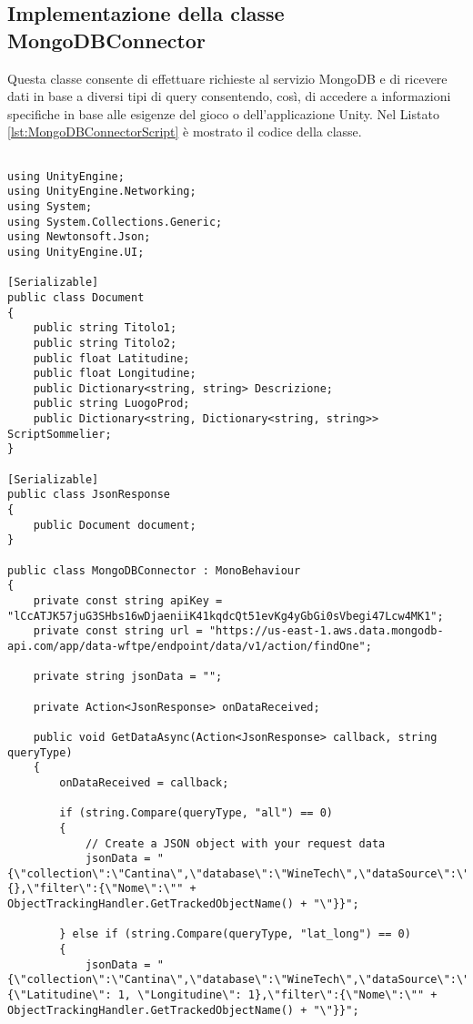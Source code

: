 \subsection{Implementazione della classe MongoDBConnector}

Questa classe consente di effettuare richieste al servizio MongoDB e di ricevere dati in base a diversi tipi di query consentendo, così, di accedere a informazioni specifiche in base alle esigenze del gioco o dell'applicazione Unity. Nel Listato \ref{lst:MongoDBConnectorScript} è mostrato il codice della classe.

\begin{lstlisting}[caption=Codice sorgente dello script \textit{MongoDBConnector}, label=lst:MongoDBConnectorScript, captionpos=b, basicstyle=\scriptsize]

using UnityEngine;
using UnityEngine.Networking;
using System;
using System.Collections.Generic;
using Newtonsoft.Json;
using UnityEngine.UI;

[Serializable]
public class Document
{
    public string Titolo1;
    public string Titolo2;
    public float Latitudine;
    public float Longitudine;
    public Dictionary<string, string> Descrizione;
    public string LuogoProd;
    public Dictionary<string, Dictionary<string, string>> ScriptSommelier;
}

[Serializable]
public class JsonResponse
{
    public Document document;
}

public class MongoDBConnector : MonoBehaviour
{
    private const string apiKey = "lCcATJK57juG3SHbs16wDjaeniiK41kqdcQt51evKg4yGbGi0sVbegi47Lcw4MK1";
    private const string url = "https://us-east-1.aws.data.mongodb-api.com/app/data-wftpe/endpoint/data/v1/action/findOne";
    
    private string jsonData = "";
    
    private Action<JsonResponse> onDataReceived;

    public void GetDataAsync(Action<JsonResponse> callback, string queryType)
    {
        onDataReceived = callback;
        
        if (string.Compare(queryType, "all") == 0)
        {
            // Create a JSON object with your request data
            jsonData = "{\"collection\":\"Cantina\",\"database\":\"WineTech\",\"dataSource\":\"ClusterWineTech\",\"projection\":{},\"filter\":{\"Nome\":\"" + ObjectTrackingHandler.GetTrackedObjectName() + "\"}}";
            
        } else if (string.Compare(queryType, "lat_long") == 0)
        {
            jsonData = "{\"collection\":\"Cantina\",\"database\":\"WineTech\",\"dataSource\":\"ClusterWineTech\",\"projection\":{\"Latitudine\": 1, \"Longitudine\": 1},\"filter\":{\"Nome\":\"" + ObjectTrackingHandler.GetTrackedObjectName() + "\"}}";
            

\end{lstlisting}
